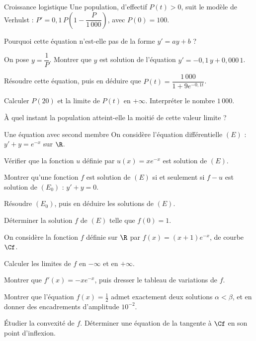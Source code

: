\begin{exercice}[3]{Croissance logistique}
Une population, d'effectif $P(t)>0$, suit le modèle de Verhulst : $P'=0{,}1\,P\left(1-\dfrac{P}{1\,000}\right)$, avec $P(0)=100$.
\begin{questions}
  \item Pourquoi cette équation n'est-elle pas de la forme $y'=ay+b$ ?
  \item On pose $y=\dfrac1P$. Montrer que $y$ est solution de l'équation $y'=-0{,}1\,y+0{,}000\,1$.
  \item Résoudre cette équation, puis en déduire que $P(t)=\dfrac{1\,000}{1+9e^{-0{,}1t}}$.
  \item Calculer $P(20)$ et la limite de $P(t)$ en $+\infty$. Interpréter le nombre $1\,000$.
  \item À quel instant la population atteint-elle la moitié de cette valeur limite ?
\end{questions}
\end{exercice}

\begin{exercice}[3]{Une équation avec second membre}
On considère l'équation différentielle $(E)$ : $y'+y=e^{-x}$ sur $\R$.
\begin{questions}
  \item Vérifier que la fonction $u$ définie par $u(x)=xe^{-x}$ est solution de $(E)$.
  \item Montrer qu'une fonction $f$ est solution de $(E)$ si et seulement si $f-u$ est solution de $(E_0)$ : $y'+y=0$.
  \item Résoudre $(E_0)$, puis en déduire les solutions de $(E)$.
  \item Déterminer la solution $f$ de $(E)$ telle que $f(0)=1$.
\end{questions}
On considère la fonction $f$ définie sur $\R$ par $f(x)=(x+1)e^{-x}$, de courbe $\Cf$.
\begin{questions}[resume]
  \item Calculer les limites de $f$ en $-\infty$ et en $+\infty$.
  \item Montrer que $f'(x)=-xe^{-x}$, puis dresser le tableau de variations de $f$.
  \item Montrer que l'équation $f(x)=\frac12$ admet exactement deux solutions $\alpha<\beta$, et en donner des encadrements d'amplitude $10^{-2}$.
  \item Étudier la convexité de $f$. Déterminer une équation de la tangente à $\Cf$ en son point d'inflexion.
\end{questions}
\end{exercice}

